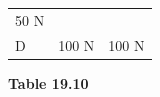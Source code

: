 \begin{enumerate}[noitemsep, label=\textbf{\arabic*}. ]
{{\begin{center}
\begin{tabular}[t]{|l|l|l|}
        50 N%
     \tabularnewline\cline{1-1}\cline{2-2}\cline{3-3}
    
    
        D &
    
    
        100 N &
    
    
        100 N%
     \tabularnewline\cline{1-1}\cline{2-2}\cline{3-3}
    \end{tabular}
      \end{center}
    \begin{center}{\small\bfseries Table 19.10}\end{center}
    
    \addtocounter{footnote}{-0}
    
          }{ %
        
    
        \begin{center}
      
      \label{m38819*id197541}
      
    \noindent
      \tablelasttail{}
      \begin{xtabular}[t]{|l|l|l|}\hline
    

\end{xtabular}
\end{center}}}
\end{enumerate}
